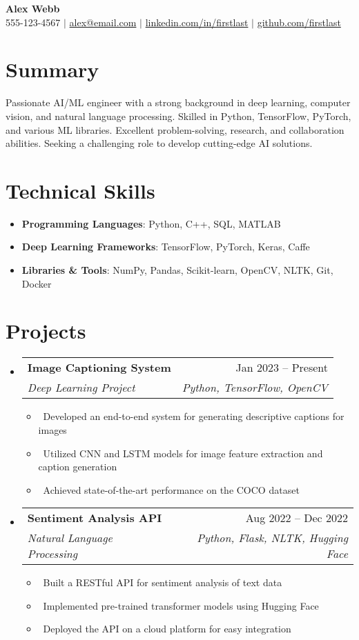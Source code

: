 \documentclass[letterpaper,10pt]{article}
\makeatletter
\newcommand{\resumeItem}[1]{\item\small{#1}}
\newcommand{\resumeSubheading}[4]{
\vspace{-1pt}\item
  \begin{tabular*}{0.97\textwidth}[t]{l@{\extracolsep{\fill}}r}
    \textbf{#1} & #2 \\
    \textit{#3} & \textit{#4} \\
  \end{tabular*}\vspace{-7pt}
}
\newcommand{\resumeSubHeadingList}{\begin{itemize}[leftmargin=0.15in, label={}]}
\newcommand{\resumeSubHeadingListEnd}{\end{itemize}}
\makeatother
\begin{document}
\begin{center}
  \textbf{\Huge Alex Webb} \\
  \small 555-123-4567 $|$ \href{mailto:alex@email.com}{alex@email.com} $|$ 
  \href{https://linkedin.com/}{linkedin.com/in/firstlast} $|$
  \href{https://github.com/}{github.com/firstlast}
\end{center}

\section*{Summary}
Passionate AI/ML engineer with a strong background in deep learning, computer vision, and natural language processing. Skilled in Python, TensorFlow, PyTorch, and various ML libraries. Excellent problem-solving, research, and collaboration abilities. Seeking a challenging role to develop cutting-edge AI solutions.

\section{Technical Skills}
\resumeSubHeadingList
  \resumeItem{\textbf{Programming Languages}: Python, C++, SQL, MATLAB}
  \resumeItem{\textbf{Deep Learning Frameworks}: TensorFlow, PyTorch, Keras, Caffe}
  \resumeItem{\textbf{Libraries \& Tools}: NumPy, Pandas, Scikit-learn, OpenCV, NLTK, Git, Docker}
\resumeSubHeadingListEnd

\section{Projects}
\resumeSubHeadingList
  \resumeSubheading
      {Image Captioning System}{Jan 2023 -- Present}
      {Deep Learning Project}{Python, TensorFlow, OpenCV}
      \resumeSubHeadingList
          \resumeItem{\textbullet\ Developed an end-to-end system for generating descriptive captions for images}
          \resumeItem{\textbullet\ Utilized CNN and LSTM models for image feature extraction and caption generation}
          \resumeItem{\textbullet\ Achieved state-of-the-art performance on the COCO dataset}
      \resumeSubHeadingListEnd
  \resumeSubheading
      {Sentiment Analysis API}{Aug 2022 -- Dec 2022} 
      {Natural Language Processing}{Python, Flask, NLTK, Hugging Face}
      \resumeSubHeadingList
          \resumeItem{\textbullet\ Built a RESTful API for sentiment analysis of text data}
          \resumeItem{\textbullet\ Implemented pre-trained transformer models using Hugging Face}
          \resumeItem{\textbullet\ Deployed the API on a cloud platform for easy integration}
      \resumeSubHeadingListEnd
\resumeSubHeadingListEnd
\end{document}

